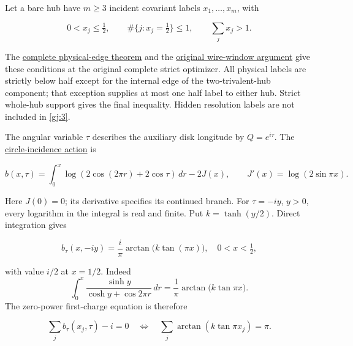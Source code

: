 Let a bare hub have \(m\ge3\) incident covariant labels \(x_1,\ldots,x_m\), with

\begin{equation}\label{gj:3}
0<x_j\le\tfrac12,\qquad
 \#\{j:x_j=\tfrac12\}\le1,\qquad
                         \sum_jx_j>1.
\end{equation}

The \href{https://sashakolpakov.github.io/murakamis_dream/notes/actual_main_meridian_component_pressure.html\#complete-physical-edge-labels-are-at-most-half}{complete physical-edge theorem}
and the \href{https://sashakolpakov.github.io/murakamis_dream/notes/actual_main_meridian_general_component_comparison.html\#the-original-complete-wire-window-and-complex-angular-parameters}{original wire-window argument}
give these conditions at the original complete strict optimizer. All physical labels are strictly below half except for the internal edge of the two-trivalent-hub component; that exception supplies at most one half label to either hub. Strict whole-hub support gives the final inequality. Hidden resolution labels are not included in \eqref{gj:3}.

The angular variable \(\tau\) describes the auxiliary disk longitude
by \(Q=e^{i\tau}\). The
\href{https://sashakolpakov.github.io/murakamis_dream/notes/actual_main_meridian_regular_circle_trace.html}{circle-incidence action}
is

\begin{equation}\label{gj:4}
b(x,\tau)=\int_0^x
       \log(2\cos(2\pi r)+2\cos\tau)\,dr-2J(x),
 \qquad J'(x)=\log(2\sin\pi x).
\end{equation}

Here \(J(0)=0\); its derivative specifies its continued branch. For \(\tau=-iy\), \(y>0\), every logarithm in the integral is real and finite. Put \(k=\tanh(y/2)\). Direct integration gives

\begin{equation}\label{gj:5}
b_\tau(x,-iy)=\frac{i}{\pi}
             \arctan\bigl(k\tan(\pi x)\bigr),
 \quad 0<x<\tfrac12,
\end{equation}

with value \(i/2\) at \(x=1/2\). Indeed
\[
 \int_0^x\frac{\sinh y}{\cosh y+\cos2\pi r}\,dr
   =\frac1\pi\arctan\bigl(k\tan\pi x\bigr).
\]
The zero-power first-charge equation is therefore

\begin{equation}\label{gj:6}
\sum_jb_\tau(x_j,\tau)-i=0
 \quad\Longleftrightarrow\quad
 \sum_j\arctan(k\tan\pi x_j)=\pi.
\end{equation}

